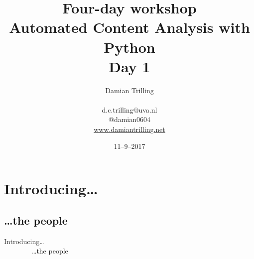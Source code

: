 \documentclass{beamer}
\begin{document}
\title[Automated Content Analysis with Python]{\textbf{Four-day workshop\\ Automated Content Analysis with Python} \\ Day 1}
\author[Damian Trilling]{Damian Trilling \\ ~ \\ \footnotesize{d.c.trilling@uva.nl \\@damian0604} \\ \url{www.damiantrilling.net}}
\date{11--9--2017}



\begin{frame}{}
\titlepage
\end{frame}





\section{Introducing\ldots}
\subsection{\ldots the people}

\begin{frame}
	Introducing\ldots \\
	~~~~~~~~\ldots the people
\end{frame}
\end{document}
